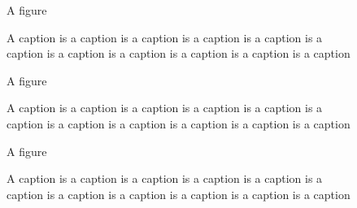 \documentclass{article}
\begin{document}
\begin{figure}
A figure
\caption{A caption is a caption is a caption is a caption
         is a caption is a caption is a caption is a caption
         is a caption is a caption is a caption}
\end{figure}

\begin{figure}
A figure
\caption{A caption is a caption is a caption is a caption
         is a caption is a caption is a caption is a caption
         is a caption is a caption is a caption}
\end{figure}

\begin{figure}
A figure
\caption{A caption is a caption is a caption is a caption
         is a caption is a caption is a caption is a caption
         is a caption is a caption is a caption}
\end{figure}
\end{document}
